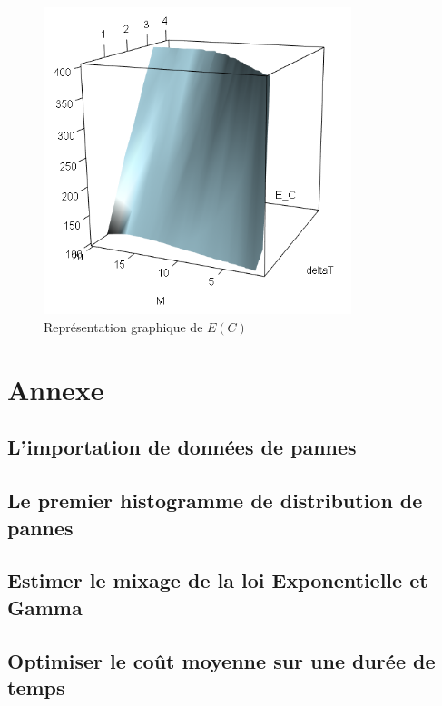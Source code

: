 \documentclass[10pt,a4paper]{article}
\begin{document}
\begin{figure}
    \centering
    \caption{Représentation graphique de $E(C)$}
    \label{fig:e_c}
    \includegraphics[width=0.8\textwidth]{img/E_C_degrad.png}
\end{figure}

\clearpage
\section{Annexe}
\subsection{L'importation de données de pannes}
\label{annexe:import_pannes}

\subsection{Le premier histogramme de distribution de pannes}
\label{annexe:premier_histo}

\subsection{Estimer le mixage de la loi Exponentielle et Gamma}
\label{annexe:em_exp_gamma}

\subsection{Optimiser le coût moyenne sur une durée de temps}
\label{annexe:optim_e_c}

\end{document}
